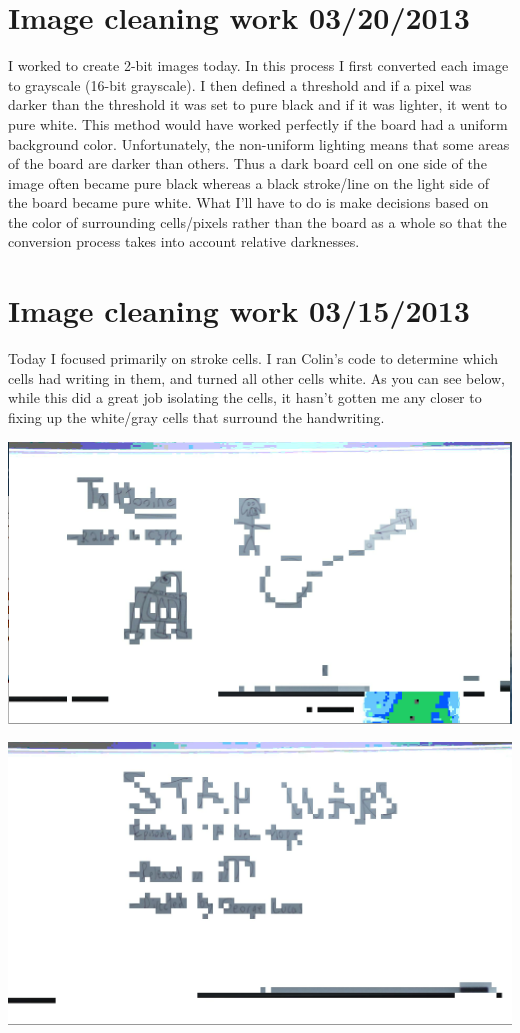 \documentclass[]{article}
\begin{document}
	\tableofcontents
	\newpage
		
	\section{Image cleaning work 03/20/2013}
	
	I worked to create 2-bit images today.
	In this process I first converted each image to grayscale (16-bit grayscale). I then defined a threshold and if a pixel was darker than the threshold it was set to pure black and if it was lighter, it went to pure white. This method would have worked perfectly if the board had a uniform background color. Unfortunately, the non-uniform lighting means that some areas of the board are darker than others. Thus a dark board cell on one side of the image often became pure black whereas a black stroke/line on the light side of the board became pure white. What I'll have to do is make decisions based on the color of surrounding cells/pixels rather than the board as a whole so that the conversion process takes into account relative darknesses.
	\section{Image cleaning work 03/15/2013}
	
	Today I focused primarily on stroke cells. I ran Colin's code to determine which cells had writing in them, and turned all other cells white. As you can see below, while this did a great job isolating the cells, it hasn't gotten me any closer to fixing up the white/gray cells that surround the handwriting.
	
	\includegraphics[scale=0.5]{images/Cells1.png}
	
	\includegraphics[scale=0.5]{images/Cells2.png}
	
\end{document}
